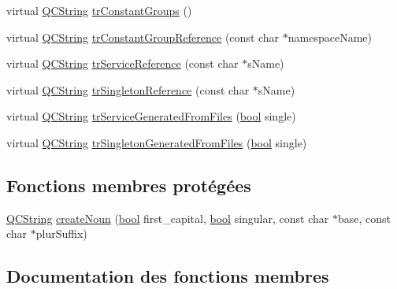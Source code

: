 \begin{DoxyCompactItemize}
\item 
virtual \hyperlink{class_q_c_string}{Q\+C\+String} \hyperlink{class_translator_swedish_ab06e86f3c486e8088f6f04e431c5edc0}{tr\+Constant\+Groups} ()
\item 
virtual \hyperlink{class_q_c_string}{Q\+C\+String} \hyperlink{class_translator_swedish_a6241fbbfbba9ba72810df238bc41cbe9}{tr\+Constant\+Group\+Reference} (const char $\ast$namespace\+Name)
\item 
virtual \hyperlink{class_q_c_string}{Q\+C\+String} \hyperlink{class_translator_swedish_ab276b047a9aff033a05abfe3f1073cae}{tr\+Service\+Reference} (const char $\ast$s\+Name)
\item 
virtual \hyperlink{class_q_c_string}{Q\+C\+String} \hyperlink{class_translator_swedish_a8308ddb8bef03268d199915925755ee0}{tr\+Singleton\+Reference} (const char $\ast$s\+Name)
\item 
virtual \hyperlink{class_q_c_string}{Q\+C\+String} \hyperlink{class_translator_swedish_a5de92d2f24e2ed5347ae5e9802089c19}{tr\+Service\+Generated\+From\+Files} (\hyperlink{qglobal_8h_a1062901a7428fdd9c7f180f5e01ea056}{bool} single)
\item 
virtual \hyperlink{class_q_c_string}{Q\+C\+String} \hyperlink{class_translator_swedish_a783d51cfbcdcfb8d27e4e11dfc2412f8}{tr\+Singleton\+Generated\+From\+Files} (\hyperlink{qglobal_8h_a1062901a7428fdd9c7f180f5e01ea056}{bool} single)
\end{DoxyCompactItemize}
\subsection*{Fonctions membres protégées}
\begin{DoxyCompactItemize}
\item 
\hyperlink{class_q_c_string}{Q\+C\+String} \hyperlink{class_translator_swedish_a1b5c5e1c0526867c6ac27361b617d2ee}{create\+Noun} (\hyperlink{qglobal_8h_a1062901a7428fdd9c7f180f5e01ea056}{bool} first\+\_\+capital, \hyperlink{qglobal_8h_a1062901a7428fdd9c7f180f5e01ea056}{bool} singular, const char $\ast$base, const char $\ast$plur\+Suffix)
\end{DoxyCompactItemize}


\subsection{Documentation des fonctions membres}
\hypertarget{class_translator_swedish_a1b5c5e1c0526867c6ac27361b617d2ee}{}
